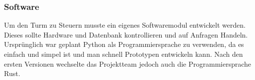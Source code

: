 \subsubsection{Software}

Um den Turm zu Steuern musste ein eigenes Softwaremodul entwickelt werden. Dieses sollte Hardware und Datenbank kontrollieren und auf Anfragen Handeln. Ursprünglich war geplant Python als Programmiersprache zu verwenden, da es einfach und simpel ist und man schnell Prototypen entwickeln kann. Nach den ersten Versionen wechselte das Projektteam jedoch auch die Programmiersprache Rust.

\clearpage


\clearpage


\clearpage


\clearpage

